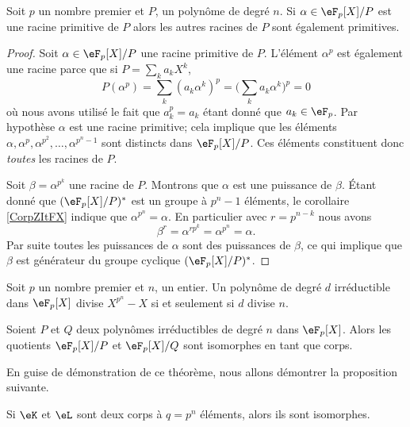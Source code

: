 \begin{lemma}       \label{Lembcerei}
    Soit \( p\) un nombre premier et \( P\), un polynôme de degré \( n\). Si \( \alpha\in \eF_p[X]/P\) est une racine primitive de \( P\) alors les autres racines de \(P\) sont également primitives.
\end{lemma}

\begin{proof}
    Soit \( \alpha\in \eF_p[X]/P\) une racine primitive de \( P\). L'élément \( \alpha^p\) est également une racine parce que si \( P=\sum_ka_kX^k\),
    \begin{equation}
        P(\alpha^p)=\sum_k(a_k\alpha^k)^p=\big( \sum_ka_k\alpha^k \big)^p=0
    \end{equation}
    où nous avons utilisé le fait que \( a_k^p=a_k\) étant donné que \( a_k\in\eF_p\). Par hypothèse \( \alpha\) est une racine primitive; cela implique que les éléments \( \alpha,\alpha^p,\alpha^{p^2},\ldots,\alpha^{p^n-1}\) sont distincts dans \( \eF_p[X]/P\). Ces éléments constituent donc \emph{toutes} les racines de \( P\).

    Soit \( \beta=\alpha^{p^k}\) une racine de \( P\). Montrons que \( \alpha\) est une puissance de \( \beta\). Étant donné que \( (\eF_p[X]/P)^*\) est un groupe à \( p^n-1\) éléments, le corollaire \ref{CorpZItFX} indique que \( \alpha^{p^n}=\alpha\). En particulier avec \( r=p^{n-k}\) nous avons
    \begin{equation}
        \beta^r=\alpha^{rp^k}=\alpha^{p^n}=\alpha.
    \end{equation}
    Par suite toutes les puissances de \( \alpha\) sont des puissances de \( \beta\), ce qui implique que \( \beta\) est générateur du groupe cyclique \( (\eF_p[X]/P)^*\).
\end{proof}

\begin{lemma}       \label{LemkzWjse}
    Soit \( p\) un nombre premier et \( n\), un entier. Un polynôme de degré \( d\) irréductible dans \( \eF_p[X]\) divise \( X^{p^n}-X\) si et seulement si \( d\) divise \( n\).
\end{lemma}

\begin{theorem}
    Soient \( P\) et \( Q\) deux polynômes irréductibles de degré \( n\) dans \( \eF_p[X]\). Alors les quotients \( \eF_p[X]/P\) et \( \eF_p[X]/Q\) sont isomorphes en tant que corps.
\end{theorem}
En guise de démonstration de ce théorème, nous allons démontrer la proposition suivante.
\begin{proposition}      \label{PropCRPjZsp}
    Si \( \eK\) et \( \eL\) sont deux corps à \( q=p^n\) éléments, alors ils sont isomorphes.
\end{proposition}

